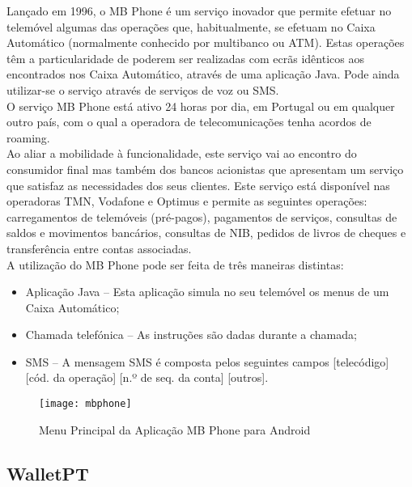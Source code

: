 Lançado em 1996, o MB Phone é um serviço inovador que permite efetuar no telemóvel algumas das operações que, habitualmente, se efetuam no Caixa Automático (normalmente conhecido por multibanco ou ATM). Estas operações têm a particularidade de poderem ser realizadas com ecrãs idênticos aos encontrados nos Caixa Automático, através de uma aplicação Java. Pode ainda utilizar-se o serviço através de serviços de voz ou SMS. 
\\O serviço MB Phone está ativo 24 horas por dia, em Portugal ou em qualquer outro país, com o qual a operadora de telecomunicações tenha acordos de roaming.
\\Ao aliar a mobilidade à funcionalidade, este serviço vai ao encontro do consumidor final mas também dos bancos acionistas que apresentam um serviço que satisfaz as necessidades dos seus clientes. Este serviço está disponível nas operadoras TMN, Vodafone e Optimus e permite as seguintes operações: carregamentos de telemóveis (pré-pagos), pagamentos de serviços, consultas de saldos e movimentos bancários, consultas de NIB, pedidos de livros de cheques e transferência entre contas associadas.\cite{mbphone}
\\A utilização do MB Phone pode ser feita de três maneiras distintas:
\begin{itemize}
\item Aplicação Java – Esta aplicação simula no seu telemóvel os menus de um Caixa Automático;
\item Chamada telefónica – As instruções são dadas durante a chamada;
\item SMS – A mensagem SMS é composta pelos seguintes campos [telecódigo] [cód. da operação] [n.º de seq. da conta] [outros].
\end{itemize}

\begin{figure}[t]
  \begin{center}
    \leavevmode
    \texttt{[image: mbphone]}
    \caption{Menu Principal da Aplicação MB Phone para Android}
    \label{fig:mbphone}
  \end{center}
\end{figure}

\subsection{WalletPT} 

